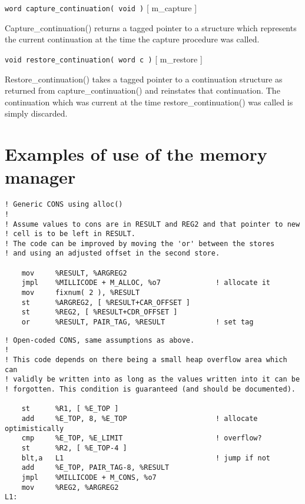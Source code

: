 \begin{description}
\item {{\tt word capture\_continuation( void )} \hfill [ {\sc m\_capture} ]}

Capture\_continuation() returns a tagged pointer to a structure which
represents the current continuation at the time the capture procedure was
called.

\item {{\tt void restore\_continuation( word c )} \hfill [ {\sc m\_restore} ] }

Restore\_continuation() takes a tagged pointer to a continuation structure
as returned from capture\_continuation() and reinstates that continuation.
The continuation which was current at the time restore\_continuation() was
called is simply discarded.

\end{description}

\section{Examples of use of the memory manager}

\begin{verbatim}
! Generic CONS using alloc()
!
! Assume values to cons are in RESULT and REG2 and that pointer to new 
! cell is to be left in RESULT.
! The code can be improved by moving the 'or' between the stores
! and using an adjusted offset in the second store.

    mov     %RESULT, %ARGREG2
    jmpl    %MILLICODE + M_ALLOC, %o7             ! allocate it
    mov     fixnum( 2 ), %RESULT
    st      %ARGREG2, [ %RESULT+CAR_OFFSET ]
    st      %REG2, [ %RESULT+CDR_OFFSET ]
    or      %RESULT, PAIR_TAG, %RESULT            ! set tag
\end{verbatim}

\begin{verbatim}
! Open-coded CONS, same assumptions as above.
!
! This code depends on there being a small heap overflow area which can
! validly be written into as long as the values written into it can be
! forgotten. This condition is guaranteed (and should be documented).

    st      %R1, [ %E_TOP ]
    add     %E_TOP, 8, %E_TOP                     ! allocate optimistically
    cmp     %E_TOP, %E_LIMIT                      ! overflow?
    st      %R2, [ %E_TOP-4 ]
    blt,a   L1                                    ! jump if not
    add     %E_TOP, PAIR_TAG-8, %RESULT
    jmpl    %MILLICODE + M_CONS, %o7
    mov     %REG2, %ARGREG2
L1:
\end{verbatim}



